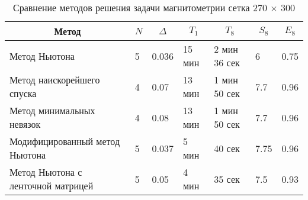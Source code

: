 \begin{table}[]
	\centering
	\renewcommand{\arraystretch}{1.5}
	\caption{Сравнение методов решения задачи магнитометрии сетка 270 $\times$ 300}
	\label{table3.2}
	\begin{tabular}{|p{}|p{}|l|l|l|l|l|}
		\hline
		\multicolumn{1}{|c|}{Метод}        & \multicolumn{1}{c|}{$N$} &
		\multicolumn{1}{c|}{$\Delta$} &
		\multicolumn{1}{c|}{$T_1$} & \multicolumn{1}{c|}{$T_8$} &	\multicolumn{1}{c|}{$S_8$}&\multicolumn{1}{c|}{$E_8$} \\ \hline
		Метод Ньютона                      &   5             & 0.036                  &     15 мин                   &      2 мин 36 сек   
		& 6 &        0.75     \\ \hline
		Метод наискорейшего спуска &   4                    & 0.07               & 13 мин    & 1 мин 50 сек & 7.7 & 0.96   \\ \hline
		Метод минимальных невязок &   4                    & 0.08               & 13 мин    & 1 мин 50 сек & 7.7 & 0.96   \\ \hline
		Модифицированный метод Ньютона     &              5           & 0.037           & 5 мин                & 40 сек  & 7.75 & 0.96\\ \hline
		Метод Ньютона с ленточной матрицей &   5                    & 0.05               & 4 мин    & 35 сек & 7.5 & 0.93   \\ \hline
	\end{tabular}
\end{table}

